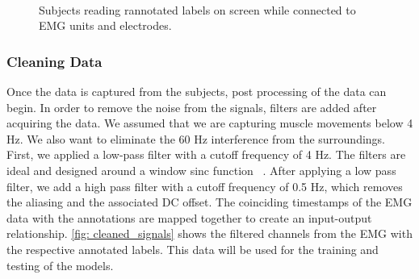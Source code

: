 \documentclass[conference]{IEEEtran}
\begin{document}
\begin{figure} 
    \centering
    \\
  \caption{Subjects reading rannotated labels on screen while connected to EMG units and electrodes.}
  \label{fig: conn-ann} 
\end{figure}

\subsubsection*{Cleaning Data}
Once the data is captured from the subjects, post processing of the data can begin. In order to remove the noise from the signals, filters are added after acquiring the data. We assumed that we are capturing muscle movements below 4 Hz. We also want to eliminate the 60 Hz interference from the surroundings. First, we applied a low-pass filter with a cutoff frequency of 4 Hz. The filters are ideal and designed around a window sinc function ~\cite{noauthor_how_nodate}. After applying a low pass filter, we add a high pass filter with a cutoff frequency of 0.5 Hz, which removes the aliasing and the associated DC offset. The coinciding timestamps of the EMG data with the annotations are mapped together to create an input-output relationship. \figurename \ref{fig: cleaned_signals} shows the filtered channels from the EMG with the respective annotated labels. This data will be used for the training and testing of the models. 
\end{document}
